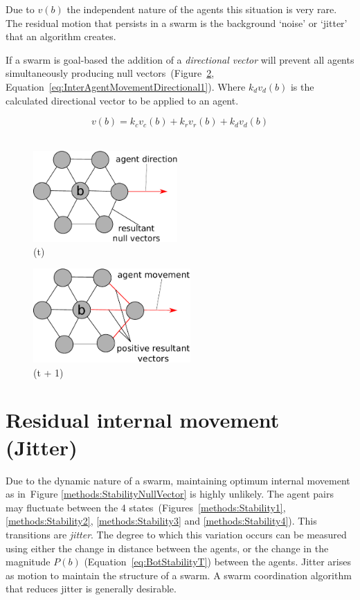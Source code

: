 \documentclass[10pt,journal,letterpaper,twoside]{IEEEtran}
\begin{document}
Due to $v(b)$ the independent nature of the agents this situation is very rare. The residual motion that persists in a swarm is the background `noise' or `jitter' that an algorithm creates.

If a swarm is goal-based the addition of a \textit{directional vector} will prevent all agents simultaneously producing null vectors~(Figure~\ref{concave:VoidPerimeter2}, Equation~\ref{eq:InterAgentMovementDirectional1}). Where $k_dv_{d}(b)$ is the calculated directional vector to be applied to an agent.

\begin{equation}\label{eq:InterAgentMovementDirectional1}
v(b) = k_cv_{c}(b) + k_rv_{r}(b) + k_dv_{d}(b)
\end{equation}‎

\begin{figure}[H]
\begin{center}
	 \includegraphics[width=5.5cm]{figures/StabilityNullVector3}
\end{center}
\label{concave:VoidPerimeter1}
\caption{(t)}
\end{figure}

\begin{figure}[H]
\begin{center}
	 \includegraphics[width=6cm]{figures/StabilityNullVector2}
\end{center}
\caption{(t + 1)}
\label{concave:VoidPerimeter2}
\end{figure}

\section{Residual internal movement (Jitter)}\label{metric:Jitter}
Due to the dynamic nature of a swarm, maintaining optimum internal movement as in~Figure \ref{methods:StabilityNullVector} is highly unlikely. The agent pairs may fluctuate between the 4 states~(Figures~\ref{methods:Stability1}, \ref{methods:Stability2}, \ref{methods:Stability3} and \ref{methods:Stability4}). This transitions are \textit{jitter}. The degree to which this variation occurs can be measured using either the change in distance between the agents, or the change in the magnitude $P(b)$ (Equation~\ref{eq:BotStabilityT}) between the agents. Jitter arises as motion to maintain the structure of a swarm. A swarm coordination algorithm that reduces jitter is generally desirable. 
\end{document}
